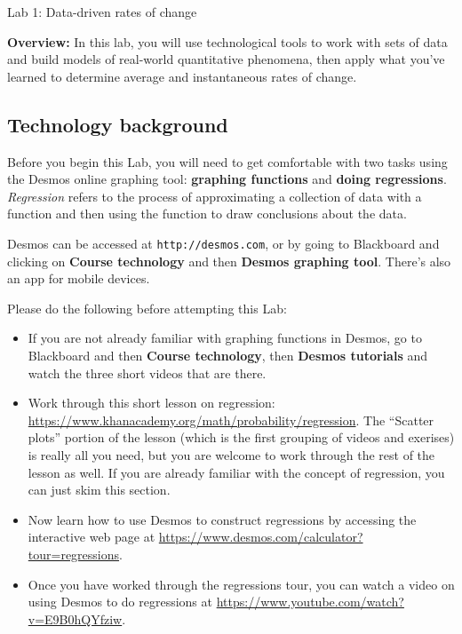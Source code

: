 \documentclass[11pt,letterpaper]{article}
\begin{document}
\begin{flushright}
	\begin{Large}
		Lab 1: Data-driven rates of change 
	\end{Large}
\end{flushright}

\noindent
\textbf{Overview:} In this lab, you will use technological tools to work with sets of data and build models of real-world quantitative phenomena, then apply what you've learned to determine average and instantaneous rates of change. 

\medskip


\hrulefill


\subsection*{Technology background}

Before you begin this Lab, you will need to get comfortable with two tasks using the Desmos online graphing tool: \textbf{graphing functions} and \textbf{doing regressions}. \textit{Regression} refers to the process of approximating a collection of data with a function and then using the function to draw conclusions about the data. 

Desmos can be accessed at \texttt{http://desmos.com}, or by going to Blackboard and clicking on \textbf{Course technology} and then \textbf{Desmos graphing tool}. There's also an app for mobile devices. 

Please do the following before attempting this Lab: 
	\begin{itemize}
	    \item If you are not already familiar with graphing functions in Desmos, go to Blackboard and then \textbf{Course technology}, then \textbf{Desmos tutorials} and watch the three short videos that are there. 
		\item Work through this short lesson on regression: \url{https://www.khanacademy.org/math/probability/regression}. The ``Scatter plots'' portion of the lesson (which is the first grouping of videos and exerises) is really all you need, but you are welcome to work through the rest of the lesson as well. If you are already familiar with the concept of regression, you can just skim this section. 
		\item Now learn how to use Desmos to construct regressions by accessing the interactive web page at \url{https://www.desmos.com/calculator?tour=regressions}. 
		\item Once you have worked through the regressions tour, you can watch a video on using Desmos to do regressions at \url{https://www.youtube.com/watch?v=E9B0hQYfziw}. 
	\end{itemize}
\end{document}
